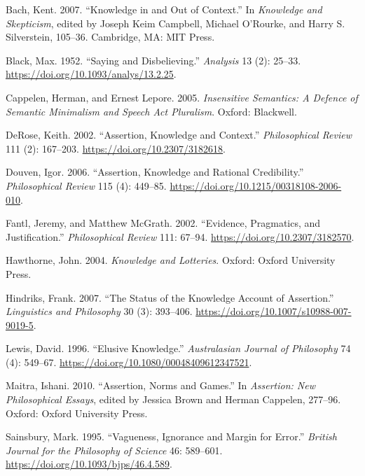 \documentclass[
  11pt,
  letterpaper,
  DIV=11,
  numbers=noendperiod]{scrartcl}
\newlength{\cslhangindent}
\newenvironment{CSLReferences}[2] %
 {\begin{list}{}{%
  \setlength{\itemindent}{0pt}
  \setlength{\leftmargin}{0pt}
  \setlength{\parsep}{0pt}
  \ifodd #1
   \setlength{\leftmargin}{\cslhangindent}
   \setlength{\itemindent}{-1\cslhangindent}
  \fi
  \setlength{\itemsep}{#2\baselineskip}}}
 {\end{list}}
\begin{document}
\label{refs}
\begin{CSLReferences}{1}{0}
Bach, Kent. 2007. {``Knowledge in and Out of Context.''} In
\emph{Knowledge and Skepticism}, edited by Joseph Keim Campbell, Michael
O'Rourke, and Harry S. Silverstein, 105--36. Cambridge, MA: MIT Press.

Black, Max. 1952. {``Saying and Disbelieving.''} \emph{Analysis} 13 (2):
25--33. \url{https://doi.org/10.1093/analys/13.2.25}.

Cappelen, Herman, and Ernest Lepore. 2005. \emph{Insensitive Semantics:
A Defence of Semantic Minimalism and Speech Act Pluralism}. Oxford:
Blackwell.

DeRose, Keith. 2002. {``Assertion, Knowledge and Context.''}
\emph{Philosophical Review} 111 (2): 167--203.
\url{https://doi.org/10.2307/3182618}.

Douven, Igor. 2006. {``Assertion, Knowledge and Rational Credibility.''}
\emph{Philosophical Review} 115 (4): 449--85.
\url{https://doi.org/10.1215/00318108-2006-010}.

Fantl, Jeremy, and Matthew McGrath. 2002. {``Evidence, Pragmatics, and
Justification.''} \emph{Philosophical Review} 111: 67--94.
\url{https://doi.org/10.2307/3182570}.

Hawthorne, John. 2004. \emph{Knowledge and Lotteries}. Oxford: Oxford
University Press.

Hindriks, Frank. 2007. {``The Status of the Knowledge Account of
Assertion.''} \emph{Linguistics and Philosophy} 30 (3): 393--406.
\url{https://doi.org/10.1007/s10988-007-9019-5}.

Lewis, David. 1996. {``Elusive Knowledge.''} \emph{Australasian Journal
of Philosophy} 74 (4): 549--67.
\url{https://doi.org/10.1080/00048409612347521}.

Maitra, Ishani. 2010. {``Assertion, Norms and Games.''} In
\emph{Assertion: New Philosophical Essays}, edited by Jessica Brown and
Herman Cappelen, 277--96. Oxford: Oxford University Press.

Sainsbury, Mark. 1995. {``Vagueness, Ignorance and Margin for Error.''}
\emph{British Journal for the Philosophy of Science} 46: 589--601.
\url{https://doi.org/10.1093/bjps/46.4.589}.


\end{CSLReferences}
\end{document}
